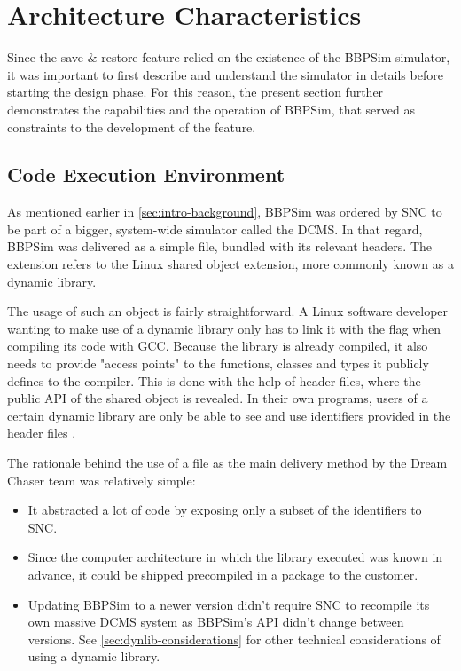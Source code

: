 {\section{Architecture Characteristics}\label{sec:bbpsim-charact}
Since the save \& restore feature relied on the existence of the \gls{BBPSim} simulator, it was important to first describe and understand the simulator in details before starting the design phase. For this reason, the present section further demonstrates the capabilities and the operation of \gls{BBPSim}, that served as constraints to the development of the feature.

\subsection*{Code Execution Environment}
As mentioned earlier in \autoref{sec:intro-background}, \gls{BBPSim} was ordered by \gls{SNC} to be part of a bigger, system-wide simulator called the \gls{DCMS}. In that regard, \gls{BBPSim} was delivered as a simple  file, bundled with its relevant headers. The  extension refers to the Linux shared object extension, more commonly known as a dynamic library. 

The usage of such an object is fairly straightforward. A Linux software developer wanting to make use of a dynamic library only has to link it with the  flag when compiling its code with GCC. Because the library is already compiled, it also needs to provide "access points" to the functions, classes and types it publicly defines to the compiler. This is done with the help of header files, where the public API of the shared object is revealed. In their own programs, users of a certain dynamic library are only be able to see and use identifiers provided in the header files .

The rationale behind the use of a  file as the main delivery method by the Dream Chaser team was relatively simple:
\begin{itemize}
	\item It abstracted a lot of code by exposing only a subset of the identifiers to \gls{SNC}.
	\item Since the computer architecture in which the library executed was known in advance, it could be shipped precompiled in a package to the customer.
	\item Updating \gls{BBPSim} to a newer version didn't require \gls{SNC} to recompile its own massive \gls{DCMS} system as \gls{BBPSim}'s API didn't change between versions. See \autoref{sec:dynlib-considerations} for other  technical considerations of using a dynamic library.
\end{itemize}

}
